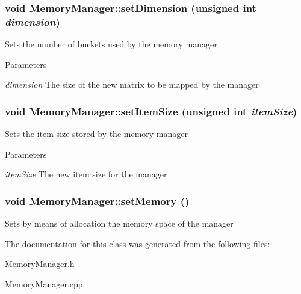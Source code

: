 \hypertarget{classMemoryManager_ad415c63e1b6d3b23eb3af19577f205a9}{
\subsubsection[{setDimension}]{\setlength{\rightskip}{0pt plus 5cm}void MemoryManager::setDimension (unsigned int {\em dimension})}}
\label{classMemoryManager_ad415c63e1b6d3b23eb3af19577f205a9}
Sets the number of buckets used by the memory manager


\begin{DoxyParams}{Parameters}
\item[{\em dimension}]The size of the new matrix to be mapped by the manager \end{DoxyParams}
\hypertarget{classMemoryManager_adf8808f7cd5cabe38563bfffa1284174}{
\subsubsection[{setItemSize}]{\setlength{\rightskip}{0pt plus 5cm}void MemoryManager::setItemSize (unsigned int {\em itemSize})}}
\label{classMemoryManager_adf8808f7cd5cabe38563bfffa1284174}
Sets the item size stored by the memory manager


\begin{DoxyParams}{Parameters}
\item[{\em itemSize}]The new item size for the manager \end{DoxyParams}
\hypertarget{classMemoryManager_adc25f40b62f5dadf19c378cdac747adc}{
\subsubsection[{setMemory}]{\setlength{\rightskip}{0pt plus 5cm}void MemoryManager::setMemory ()}}
\label{classMemoryManager_adc25f40b62f5dadf19c378cdac747adc}
Sets by means of allocation the memory space of the manager 

The documentation for this class was generated from the following files:\begin{DoxyCompactItemize}
\item 
\hyperlink{MemoryManager_8h}{MemoryManager.h}\item 
MemoryManager.cpp\end{DoxyCompactItemize}
